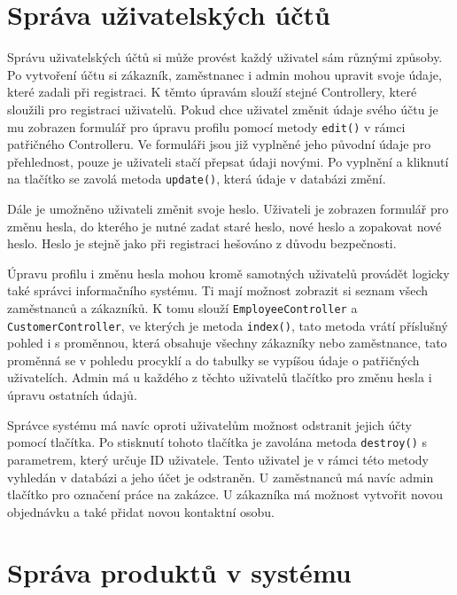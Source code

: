 \section{Správa uživatelských účtů}

Správu uživatelských účtů si může provést každý uživatel sám různými způsoby. Po vytvoření účtu si zákazník, zaměstnanec i admin mohou upravit svoje údaje, které zadali při registraci. K těmto úpravám slouží stejné Controllery, které sloužili pro registraci uživatelů.  Pokud chce uživatel změnit údaje svého účtu je mu zobrazen formulář pro úpravu profilu pomocí metody \texttt{edit()} v rámci patřičného Controlleru. Ve formuláři jsou již vyplněné jeho původní údaje pro přehlednost, pouze je uživateli stačí přepsat údaji novými. Po vyplnění a kliknutí na tlačítko se zavolá metoda \texttt{update()}, která údaje v databázi změní.

Dále je umožněno uživateli změnit svoje heslo. Uživateli je zobrazen formulář pro změnu hesla, do kterého je nutné zadat staré heslo, nové heslo a zopakovat nové heslo. Heslo je stejně jako při registraci hešováno z důvodu bezpečnosti. 

Úpravu profilu i změnu hesla mohou kromě samotných uživatelů provádět logicky také správci informačního systému. Ti mají možnost zobrazit si seznam všech zaměstnanců a zákazníků. K tomu slouží  \texttt{EmployeeController} a \texttt{CustomerController}, ve kterých je metoda \texttt{index()}, tato metoda vrátí příslušný pohled i s proměnnou, která obsahuje všechny zákazníky nebo zaměstnance, tato proměnná se v pohledu procyklí a do tabulky se vypíšou údaje o patřičných uživatelích. Admin má u každého z těchto uživatelů tlačítko pro změnu hesla i úpravu ostatních údajů.

Správce systému má navíc oproti uživatelům možnost odstranit jejich účty pomocí tlačítka. Po stisknutí tohoto tlačítka je zavolána metoda \texttt{destroy()} s parametrem, který určuje ID uživatele. Tento uživatel je v rámci této metody vyhledán v databázi a jeho účet je odstraněn. U zaměstnanců má navíc admin tlačítko pro označení práce na zakázce. U zákazníka má možnost vytvořit novou objednávku a také přidat novou kontaktní osobu.

\section{Správa produktů v systému}

